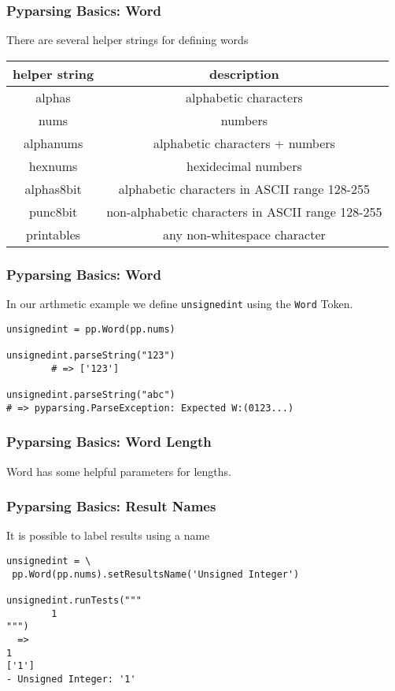 \documentclass{beamer}
\begin{document}
\begin{frame}[fragile]
 \frametitle{Pyparsing Basics: Word}
There are several helper strings for defining words \\ 
\begin{center}
  \begin{tabular}{ | c | c | }
    \hline
    helper string & description \\ \hline\hline
    alphas & alphabetic characters  \\ \hline
    nums & numbers \\ \hline
    alphanums & alphabetic characters + numbers  \\ \hline
    hexnums & hexidecimal numbers  \\ \hline
    alphas8bit & alphabetic characters in ASCII range 128-255 \\ \hline
    punc8bit & non-alphabetic characters in ASCII range 128-255 \\ \hline
    printables & any non-whitespace character \\
  \hline
  \end{tabular}
\end{center}

\end{frame}

\begin{frame}[fragile]
 \frametitle{Pyparsing Basics: Word}
In our arthmetic example we define \texttt{unsignedint} using the \texttt{Word} Token.
\begin{verbatim}
unsignedint = pp.Word(pp.nums)

unsignedint.parseString("123")
        # => ['123']	

unsignedint.parseString("abc")
# => pyparsing.ParseException: Expected W:(0123...)	
\end{verbatim}
\end{frame}

\begin{frame}
\frametitle{Pyparsing Basics: Word Length}
Word has some helpful parameters for lengths.



\end{frame}


\begin{frame}[fragile]
\frametitle{Pyparsing Basics: Result Names}
It is possible to label results using a name
\begin{verbatim}
unsignedint = \
 pp.Word(pp.nums).setResultsName('Unsigned Integer')

unsignedint.runTests("""
        1
""") 
  =>
1
['1']
- Unsigned Integer: '1'
\end{verbatim}
\end{frame}
\end{document}
